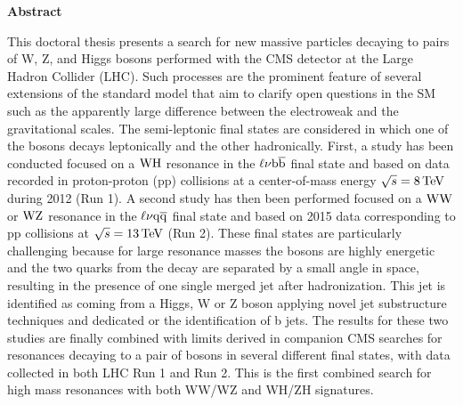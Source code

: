 \vspace*{\fill}

\begin{center}
\Large
\textbf{Abstract}
\end{center}

\noindent This doctoral thesis presents a search for new massive particles decaying to pairs of W, Z, and Higgs bosons performed with the CMS detector at the Large Hadron Collider (LHC).
Such processes are the prominent feature of several extensions of the standard model that aim to clarify open questions in the SM such as the apparently large difference between the electroweak and the gravitational scales. 
The semi-leptonic final states are considered in which one of the bosons decays leptonically and the other hadronically. 
First, a study has been conducted focused on a $\mathrm{W}\mathrm{H}$ resonance in the $\ell\nu{\mathrm{b}\overline{\mathrm{b}}}$ final state and based on data recorded in proton-proton (pp) collisions at a center-of-mass energy $\sqrt{s} = 8\,\text{Te\hspace{-.08em}V}$ during 2012 (Run 1).
A second study has then been performed focused on a $\mathrm{W}\mathrm{W}$ or $\mathrm{W}\mathrm{Z}$ resonance in the $\ell\nu\mathrm{q}\overline{\mathrm{q}}$ final state and based on 2015 data corresponding to pp collisions at $\sqrt{s} = 13\,\text{Te\hspace{-.08em}V}$ (Run 2).
These final states are particularly challenging because for large resonance masses the bosons are highly energetic and the two quarks from the decay are separated by a small angle in space, resulting in the presence of one single merged jet after hadronization. This jet is identified as coming from a Higgs, W or Z boson applying novel jet substructure techniques and dedicated or the identification of b jets.
The results for these two studies are finally combined with limits derived in companion CMS searches for resonances decaying to a pair of bosons in several different final states, with data collected in both LHC Run 1 and Run 2.
This is the first combined search for high mass resonances with both WW/WZ and WH/ZH signatures.\\

